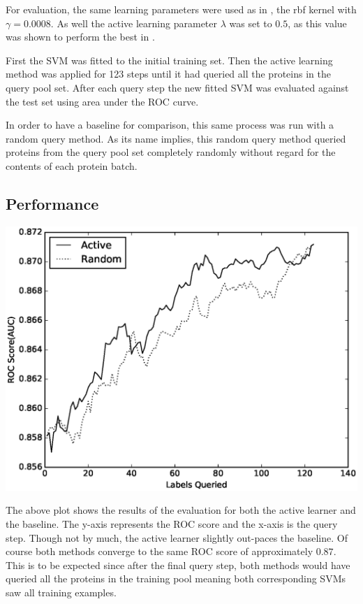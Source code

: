 \documentclass{article}
\begin{document}
For evaluation, the same learning parameters were used as in \cite{dbsi_server}, the rbf kernel with $\gamma = 0.0008$. As well the active learning parameter $\lambda$ was set to $0.5$, as this value was shown to perform the best in \cite{active_learning}.

First the SVM was fitted to the initial training set. Then the active learning method was applied for 123 steps until it had queried all the proteins in the query pool set. After each query step the new fitted SVM was evaluated against the test set using area under the ROC curve. 

In order to have a baseline for comparison, this same process was run with a random query method. As its name implies, this random query method queried proteins from the query pool set completely randomly without regard for the contents of each protein batch. 
\subsection*{Performance}

\includegraphics[scale=0.5]{plot}

The above plot shows the results of the evaluation for both the active learner and the baseline. The y-axis represents the ROC score and the x-axis is the query step. Though not by much, the active learner slightly out-paces the baseline. Of course both methods converge to the same ROC score of approximately $0.87$. This is to be expected since after the final query step, both methods would have queried all the proteins in the training pool meaning both corresponding SVMs saw all training examples.
\end{document}
